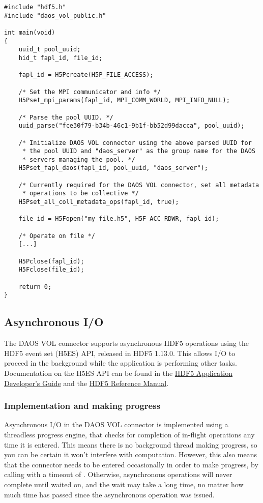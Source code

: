 \documentclass[../users_guide.tex]{subfiles}
\begin{document}
\begin{verbatim}
#include "hdf5.h"
#include "daos_vol_public.h"

int main(void)
{
    uuid_t pool_uuid;
    hid_t fapl_id, file_id;

    fapl_id = H5Pcreate(H5P_FILE_ACCESS);

    /* Set the MPI communicator and info */
    H5Pset_mpi_params(fapl_id, MPI_COMM_WORLD, MPI_INFO_NULL);

    /* Parse the pool UUID. */
    uuid_parse("fce30f79-b34b-46c1-9b1f-bb52d99dacca", pool_uuid);

    /* Initialize DAOS VOL connector using the above parsed UUID for
     * the pool UUID and "daos_server" as the group name for the DAOS
     * servers managing the pool. */
    H5Pset_fapl_daos(fapl_id, pool_uuid, "daos_server");

    /* Currently required for the DAOS VOL connector, set all metadata
     * operations to be collective */
    H5Pset_all_coll_metadata_ops(fapl_id, true); 

    file_id = H5Fopen("my_file.h5", H5F_ACC_RDWR, fapl_id);

    /* Operate on file */
    [...]

    H5Pclose(fapl_id);
    H5Fclose(file_id);

    return 0;
}
\end{verbatim}

\subsection{Asynchronous I/O}

The DAOS VOL connector supports asynchronous HDF5 operations using the HDF5
event set (H5ES) API, released in HDF5 1.13.0. This allows I/O to proceed in the
background while the application is performing other tasks. Documentation on the
H5ES API can be found in the
\href{https://portal.hdfgroup.org/display/HDF5/Asynchronous+operations+with+HDF5+VOL+connectors}{HDF5 Application Developer's Guide} and the
\href{https://portal.hdfgroup.org/display/HDF5/Event+Set}{HDF5 Reference Manual}.


\subsubsection{Implementation and making progress}

Asynchronous I/O in the DAOS VOL connector is implemented using a threadless
progress engine, that checks for completion of in-flight operations any time it
is entered. This means there is no background thread making progress, so you can
be certain it won't interfere with computation. However, this also means that
the connector needs to be entered occasionally in order to make progress, by
calling  with a timeout of . Otherwise,
asynchronous operations will never complete until waited on, and the wait may
take a long time, no matter how much time has passed since the asynchronous
operation was issued.
\end{document}
